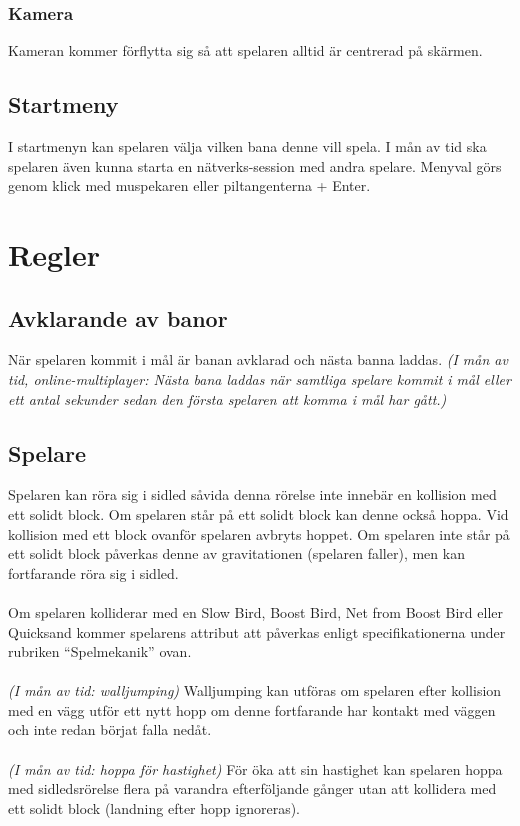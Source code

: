 \documentclass{TDP003mall}
\begin{document}
\subsubsection{Kamera}
Kameran kommer förflytta sig så att spelaren alltid är centrerad på skärmen.

\subsection{Startmeny}
I startmenyn kan spelaren välja vilken bana denne vill spela. I mån av tid ska spelaren även kunna starta en nätverks-session med andra spelare. Menyval görs genom klick med muspekaren eller piltangenterna + Enter.

\section{Regler}

\subsection{Avklarande av banor}
När spelaren kommit i mål är banan avklarad och nästa banna laddas. \textit{(I mån av tid, online-multiplayer: Nästa bana laddas när samtliga spelare kommit i mål eller ett antal sekunder sedan den första spelaren att komma i mål har gått.)}

\subsection{Spelare}
Spelaren kan röra sig i sidled såvida denna rörelse inte innebär en kollision med ett solidt block. Om spelaren står på ett solidt block kan denne också hoppa. Vid kollision med ett block ovanför spelaren avbryts hoppet. Om spelaren inte står på ett solidt block påverkas denne av gravitationen (spelaren faller), men kan fortfarande röra sig i sidled.
\\\\
Om spelaren kolliderar med en Slow Bird, Boost Bird, Net from Boost Bird eller Quicksand kommer spelarens attribut att påverkas enligt specifikationerna under rubriken ``Spelmekanik'' ovan.
\\\\
\noindent\textit{(I mån av tid: walljumping)} Walljumping kan utföras om spelaren efter kollision med en vägg utför ett nytt hopp om denne fortfarande har kontakt med väggen och inte redan börjat falla nedåt.
\\\\
\noindent\textit{(I mån av tid: hoppa för hastighet)} För öka att sin hastighet kan spelaren hoppa med sidledsrörelse flera på varandra efterföljande gånger utan att kollidera med ett solidt block (landning efter hopp ignoreras).
\end{document}
